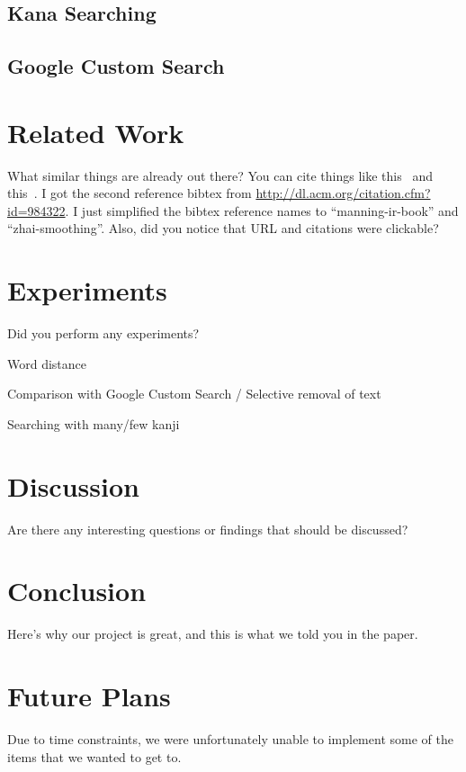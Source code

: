 \documentclass{acm} %
\begin{document}
\begin{CJK}{UTF8}{zhsong}
\subsection{Kana Searching}

\subsection{Google Custom Search}

\section{Related Work}

What similar things are already out there? You can cite things like
this~\cite{manning-ir-book} and this~\cite{zhai-smoothing}. I got the second
reference bibtex from \url{http://dl.acm.org/citation.cfm?id=984322}. I just
simplified the bibtex reference names to ``manning-ir-book'' and
``zhai-smoothing''. Also, did you notice that URL and citations were clickable?

\section{Experiments}

Did you perform any experiments?

Word distance

Comparison with Google Custom Search / Selective removal of text

Searching with many/few kanji

\section{Discussion}

Are there any interesting questions or findings that should be discussed?

\section{Conclusion}

Here's why our project is great, and this is what we told you in the paper.

\section{Future Plans}

Due to time constraints, we were unfortunately unable to implement some of the items that we wanted to get to.


\end{CJK}
\end{document}
